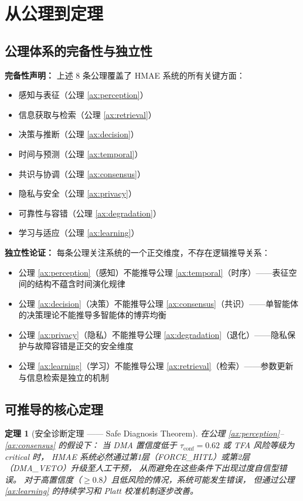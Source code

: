 \documentclass[11pt,a4paper]{ctexart}
\newtheorem{theorem}{定理}[section]
\theoremstyle{remark}
\begin{document}
\section{从公理到定理}

\subsection{公理体系的完备性与独立性}

\textbf{完备性声明：} 上述 8 条公理覆盖了 HMAE 系统的所有关键方面：
\begin{itemize}[nosep]
\item 感知与表征（公理 \ref{ax:perception}）
\item 信息获取与检索（公理 \ref{ax:retrieval}）
\item 决策与推断（公理 \ref{ax:decision}）
\item 时间与预测（公理 \ref{ax:temporal}）
\item 共识与协调（公理 \ref{ax:consensus}）
\item 隐私与安全（公理 \ref{ax:privacy}）
\item 可靠性与容错（公理 \ref{ax:degradation}）
\item 学习与适应（公理 \ref{ax:learning}）
\end{itemize}

\textbf{独立性论证：} 每条公理关注系统的一个正交维度，不存在逻辑推导关系：
\begin{itemize}[nosep]
\item 公理 \ref{ax:perception}（感知）不能推导公理 \ref{ax:temporal}（时序）——表征空间的结构不蕴含时间演化规律
\item 公理 \ref{ax:decision}（决策）不能推导公理 \ref{ax:consensus}（共识）——单智能体的决策理论不能推导多智能体的博弈均衡
\item 公理 \ref{ax:privacy}（隐私）不能推导公理 \ref{ax:degradation}（退化）——隐私保护与故障容错是正交的安全维度
\item 公理 \ref{ax:learning}（学习）不能推导公理 \ref{ax:retrieval}（检索）——参数更新与信息检索是独立的机制
\end{itemize}

\subsection{可推导的核心定理}

\begin{theorem}[安全诊断定理 —— Safe Diagnosis Theorem]
在公理 \ref{ax:perception}--\ref{ax:consensus} 的假设下：
当 DMA 置信度低于 $\tau_{\text{conf}} = 0.62$ 或 TFA 风险等级为 critical 时，
HMAE 系统必然通过第1层（FORCE\_HITL）或第2层（DMA\_VETO）升级至人工干预，
从而避免在这些条件下出现过度自信型错误。
对于高置信度（$\geq 0.8$）且低风险的情况，系统可能发生错误，
但通过公理 \ref{ax:learning} 的持续学习和 Platt 校准机制逐步改善。
\end{theorem}
\end{document}
